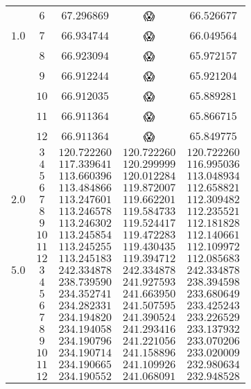 \documentclass[
    a4paper, aps, twocolumn, floatfix, superscriptaddress,
    nofootinbib]{revtex4-1}
\newcommand{\nan}{\DejaSans 😱}
\newcommand{\1}{\mathds{1}}
\begin{document}
\begin{table}
\begin{ruledtabular}
\begin{tabular}{c|c|ccc}
                      & $6$ & $67.296869$ & \nan & $66.526677$ \\
                $1.0$ & $7$ & $66.934744$ & \nan & $66.049564$ \\
                      & $8$ & $66.923094$ & \nan & $65.972157$ \\
                      & $9$ & $66.912244$ & \nan & $65.921204$ \\
                      & $10$ & $66.912035$ & \nan & $65.889281$ \\
                      & $11$ & $66.911364$ & \nan & $65.866715$ \\
                      & $12$ & $66.911364$ & \nan & $65.849775$ \\
                \hline
                      & $3$ & $120.722260$ & $120.722260$ & $120.722260$ \\
                      & $4$ & $117.339641$ & $120.299999$ & $116.995036$ \\
                      & $5$ & $113.660396$ & $120.012284$ & $113.048934$ \\
                      & $6$ & $113.484866$ & $119.872007$ & $112.658821$ \\
                $2.0$ & $7$ & $113.247601$ & $119.662201$ & $112.309482$ \\
                      & $8$ & $113.246578$ & $119.584733$ & $112.235521$ \\
                      & $9$ & $113.246302$ & $119.524417$ & $112.181828$ \\
                      & $10$ & $113.245854$ & $119.472283$ & $112.140661$ \\
                      & $11$ & $113.245255$ & $119.430435$ & $112.109972$ \\
                      & $12$ & $113.245183$ & $119.394712$ & $112.085683$ \\
                \hline
                $5.0$ & $3$ & $242.334878$ & $242.334878$ & $242.334878$ \\
                      & $4$ & $238.739590$ & $241.927593$ & $238.394598$ \\
                      & $5$ & $234.352741$ & $241.663950$ & $233.680649$ \\
                      & $6$ & $234.282331$ & $241.507595$ & $233.425243$ \\
                      & $7$ & $234.194820$ & $241.390524$ & $233.226529$ \\
                      & $8$ & $234.194058$ & $241.293416$ & $233.137932$ \\
                      & $9$ & $234.190796$ & $241.221056$ & $233.070206$ \\
                      & $10$ & $234.190714$ & $241.158896$ & $233.020009$ \\
                      & $11$ & $234.190665$ & $241.109926$ & $232.980634$ \\
                      & $12$ & $234.190552$ & $241.068091$ & $232.948528$
            \end{tabular}
        \end{ruledtabular}
        \label{tab:N12}
    \end{table}
\end{document}
